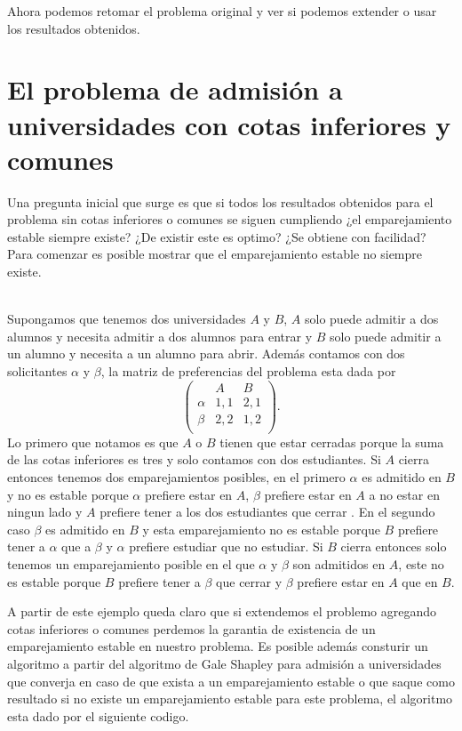 Ahora podemos retomar el problema original y ver si podemos extender o usar los resultados obtenidos. 

\section{El problema de admisión a universidades con cotas inferiores y comunes}

Una pregunta inicial que surge es que si todos los resultados obtenidos para el problema sin cotas inferiores o comunes se siguen cumpliendo ¿el emparejamiento estable siempre existe? ¿De existir este es optimo? ¿Se obtiene con facilidad? Para comenzar es posible mostrar que el emparejamiento estable no siempre existe.

\begin{eje}
\cite{Todo}\\
Supongamos que tenemos dos universidades $A$ y $B$, $A$ solo puede admitir a dos alumnos y necesita admitir a dos alumnos para entrar y $B$ solo puede admitir a un alumno y necesita a un alumno para abrir. Además contamos con dos solicitantes $\alpha$ y $\beta$, la matriz de preferencias del problema esta dada por 
$$\begin{pmatrix}
& A & B  \\
\alpha & 1,1 & 2,1  \\
\beta & 2,2 & 1,2 \\ 
\end{pmatrix}.$$
Lo primero que notamos es que $A$ o $B$ tienen que estar cerradas porque la suma de las cotas inferiores es tres y solo contamos con dos estudiantes. Si $A$ cierra entonces tenemos dos emparejamientos posibles, en el primero $\alpha$ es admitido en $B$ y no es estable porque $\alpha$ prefiere estar en $A$, $\beta$ prefiere estar en $A$ a no estar en ningun lado y $A$ prefiere tener a los dos estudiantes que cerrar . En el segundo caso $\beta$ es admitido en $B$ y esta emparejamiento no es estable porque $B$ prefiere tener a $\alpha$ que a $\beta$ y $\alpha$ prefiere estudiar que no estudiar. Si $B$ cierra entonces solo tenemos un emparejamiento posible en el que $\alpha$ y $\beta$ son admitidos en $A$, este no es estable porque $B$ prefiere tener a $\beta$ que cerrar y $\beta$ prefiere estar en $A$ que en $B$.
\fin
\end{eje}

A partir de este ejemplo queda claro que si extendemos el problemo agregando cotas inferiores o comunes perdemos la garantia de existencia de un emparejamiento estable en nuestro problema. Es posible además consturir un algoritmo a partir del algoritmo de Gale Shapley para admisión a universidades que converja en caso de que exista a un emparejamiento estable o que saque como resultado si no existe un emparejamiento estable para este problema, el algoritmo esta dado por el siguiente codigo.
 
